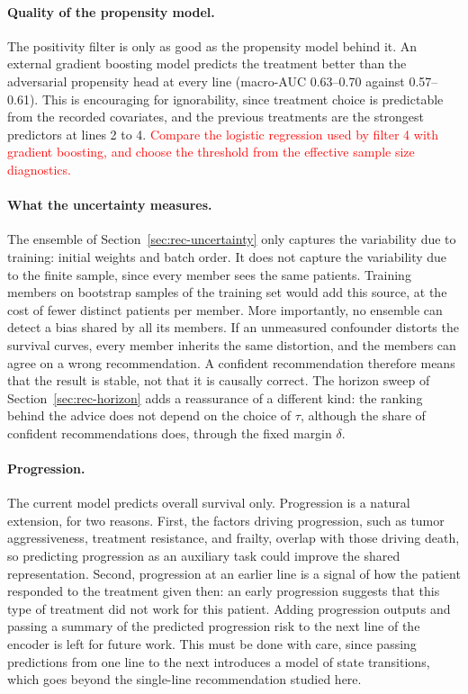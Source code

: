\documentclass[a4paper,10pt]{article}
\newcommand{\todo}[1]{\textcolor{red}{#1}}
\begin{document}
\paragraph{Quality of the propensity model.} The positivity filter is only as good as the propensity model behind it. An external gradient boosting model predicts the treatment better than the adversarial propensity head at every line (macro-AUC 0.63--0.70 against 0.57--0.61). This is encouraging for ignorability, since treatment choice is predictable from the recorded covariates, and the previous treatments are the strongest predictors at lines 2 to 4. \todo{Compare the logistic regression used by filter 4 with gradient boosting, and choose the threshold from the effective sample size diagnostics.}

\paragraph{What the uncertainty measures.} The ensemble of Section~\ref{sec:rec-uncertainty} only captures the variability due to training: initial weights and batch order. It does not capture the variability due to the finite sample, since every member sees the same patients. Training members on bootstrap samples of the training set would add this source, at the cost of fewer distinct patients per member. More importantly, no ensemble can detect a bias shared by all its members. If an unmeasured confounder distorts the survival curves, every member inherits the same distortion, and the members can agree on a wrong recommendation. A confident recommendation therefore means that the result is stable, not that it is causally correct. The horizon sweep of Section~\ref{sec:rec-horizon} adds a reassurance of a different kind: the ranking behind the advice does not depend on the choice of $\tau$, although the share of confident recommendations does, through the fixed margin $\delta$.

\paragraph{Progression.} The current model predicts overall survival only. Progression is a natural extension, for two reasons. First, the factors driving progression, such as tumor aggressiveness, treatment resistance, and frailty, overlap with those driving death, so predicting progression as an auxiliary task could improve the shared representation. Second, progression at an earlier line is a signal of how the patient responded to the treatment given then: an early progression suggests that this type of treatment did not work for this patient. Adding progression outputs and passing a summary of the predicted progression risk to the next line of the encoder is left for future work. This must be done with care, since passing predictions from one line to the next introduces a model of state transitions, which goes beyond the single-line recommendation studied here.
\end{document}
